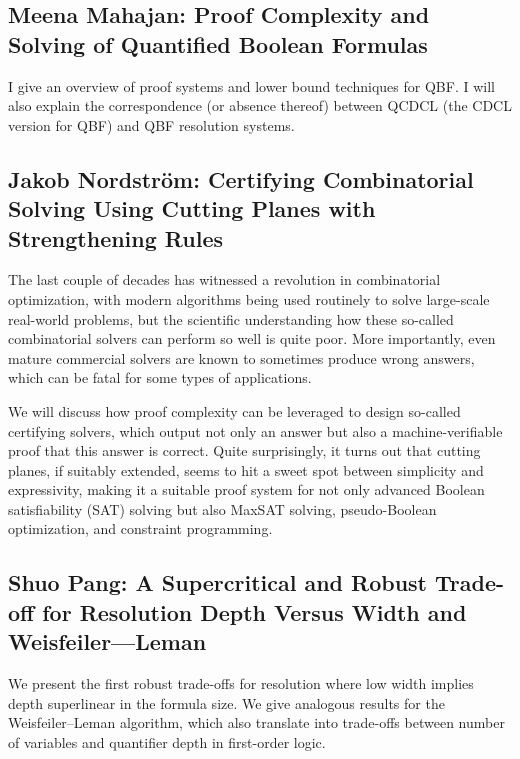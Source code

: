 \documentclass[11pt]{article}
\begin{document}
\subsection*{Meena Mahajan: Proof Complexity and Solving of Quantified Boolean Formulas}\label{Mahajan}

I give an overview of proof systems and lower bound techniques for QBF. I will also explain the correspondence (or absence thereof) between QCDCL (the CDCL version for QBF) and QBF resolution systems.


\subsection*{Jakob Nordstr\"{o}m: Certifying Combinatorial Solving Using Cutting Planes with Strengthening Rules}\label{Nordstrom}


The last couple of decades has witnessed a revolution in combinatorial optimization, with modern algorithms being used routinely to solve large-scale real-world problems, but the scientific understanding how these so-called combinatorial solvers can perform so well is quite poor. More importantly, even mature commercial solvers are known to sometimes produce wrong answers, which can be fatal for some types of applications.

We will discuss how proof complexity can be leveraged to design so-called certifying solvers, which output not only an answer but also a machine-verifiable proof that this answer is correct. Quite surprisingly, it turns out that cutting planes, if suitably extended, seems to hit a sweet spot between simplicity and expressivity, making it a suitable proof system for not only advanced Boolean satisfiability (SAT) solving but also MaxSAT solving, pseudo-Boolean optimization, and constraint programming.

\subsection*{Shuo Pang: A Supercritical and Robust Trade-off for Resolution Depth Versus Width and Weisfeiler—Leman}\label{Pang}
We present the first robust trade-offs for resolution where low width implies depth superlinear in the formula size. We give analogous results for the Weisfeiler--Leman algorithm, which also translate into trade-offs between number of variables and quantifier depth in first-order logic.
\end{document}
